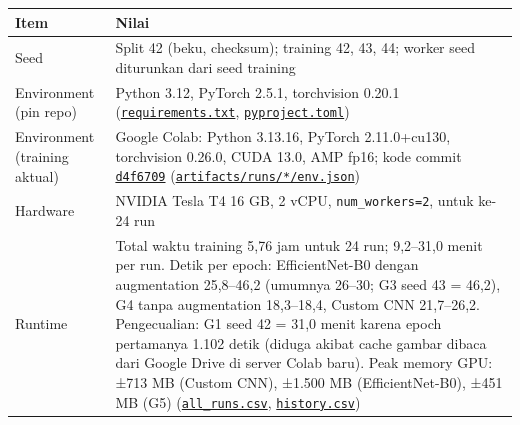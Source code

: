 \documentclass[10pt,a4paper]{article}
\newcounter{none} %
\begin{document}
{\def\LTcaptype{none} %
\begin{longtable}[]{@{}
  >{\raggedright\arraybackslash}p{}
  >{\raggedright\arraybackslash}p{}@{}}
\toprule\noalign{}
\begin{minipage}[b]{\linewidth}\raggedright
Item
\end{minipage} & \begin{minipage}[b]{\linewidth}\raggedright
Nilai
\end{minipage} \\
\midrule\noalign{}
\endhead
\bottomrule\noalign{}
\endlastfoot
Seed & Split 42 (beku, checksum); training 42, 43, 44; worker seed diturunkan dari seed training \\
Environment (pin repo) & Python 3.12, PyTorch 2.5.1, torchvision 0.20.1 (\href{https://github.com/Universitas-Cakrawala/semarang-batik-fine-grained-transfer-learning/blob/main/requirements.txt}{\texttt{requirements.txt}}, \href{https://github.com/Universitas-Cakrawala/semarang-batik-fine-grained-transfer-learning/blob/main/pyproject.toml}{\texttt{pyproject.toml}}) \\
Environment (training aktual) & Google Colab: Python 3.13.16, PyTorch 2.11.0+cu130, torchvision 0.26.0, CUDA 13.0, AMP fp16; kode commit \href{https://github.com/Universitas-Cakrawala/semarang-batik-fine-grained-transfer-learning/commit/d4f6709}{\texttt{d4f6709}} (\href{https://github.com/Universitas-Cakrawala/semarang-batik-fine-grained-transfer-learning/tree/main/artifacts/runs}{\texttt{artifacts/\allowbreak{}runs/\allowbreak{}*/\allowbreak{}env.json}}) \\
Hardware & NVIDIA Tesla T4 16 GB, 2 vCPU, \texttt{num\_\allowbreak{}workers=2}, untuk ke-24 run \\
Runtime & Total waktu training 5,76 jam untuk 24 run; 9,2--31,0 menit per run. Detik per epoch: EfficientNet-B0 dengan augmentation 25,8--46,2 (umumnya 26--30; G3 seed 43 = 46,2), G4 tanpa augmentation 18,3--18,4, Custom CNN 21,7--26,2. Pengecualian: G1 seed 42 = 31,0 menit karena epoch pertamanya 1.102 detik (diduga akibat cache gambar dibaca dari Google Drive di server Colab baru). Peak memory GPU: ±713 MB (Custom CNN), ±1.500 MB (EfficientNet-B0), ±451 MB (G5) (\href{https://github.com/Universitas-Cakrawala/semarang-batik-fine-grained-transfer-learning/blob/main/artifacts/metrics/all_runs.csv}{\texttt{all\_\allowbreak{}runs.csv}}, \href{https://github.com/Universitas-Cakrawala/semarang-batik-fine-grained-transfer-learning/tree/main/artifacts/runs}{\texttt{history.csv}}) \\

\end{longtable}}
\end{document}
